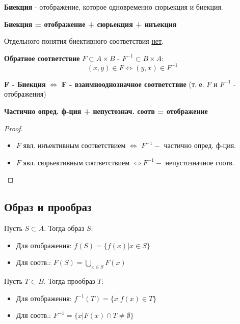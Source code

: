 \begin{definition}
    \textbf{Биекция} - отображение, которое одновременно сюрьекция и биекция.

    \textbf{Биекция = отображение + сюрьекция + инъекция}
\end{definition}
\begin{note}
    Отдельного понятия биективного соответствия \underline{нет}.
\end{note}
\begin{definition}
    \textbf{Обратное соответствие} $F \subset A \times B$ - $F^{-1} \subset B \times A$:
    \[
        (x, y) \in F \iff (y, x) \in F^{-1}
    \] 
\end{definition}
\begin{theorem}
    \textbf{F - Биекция} $\iff$ \textbf{F - взаимнооднозначное соответствие} (т. е. $F$ и $F^{-1}$ - отображения)
\end{theorem}
\begin{note}
        \textbf{Частично опред. ф-ция + непустознач. соотв = отображение}
\end{note}
\begin{proof}
    ~\newline
        \begin{itemize}
            \item $F$ явл. инъективным соответствием $\iff$ $F^{-1} - $ частично опред. ф-ция.
            \item $F$ явл. сюрьективным соответствием $\iff F^{-1} - $ непустозначное соотв.
        \end{itemize}
\end{proof}

\subsection{Образ и прообраз}
\begin{definition}
Пусть $S \subset A$. Тогда образ $S$: 
\begin{itemize}
    \item Для отображения: $f(S) = \{f(x) | x \in S\}$ 
    \item Для соотв.: $F(S) = \bigcup_{x \in S}^{} F(x)$
\end{itemize}
\end{definition}

\begin{definition}
Пусть $T \subset B$. Тогда прообраз $T$:
\begin{itemize}
    \item Для отображения: $f^{-1}(T) = \{x | f(x) \in T\}$
    \item Для соотв.: $F^{-1} = \{x | F(x) \cap T \neq \emptyset\}$
\end{itemize}
\end{definition}

